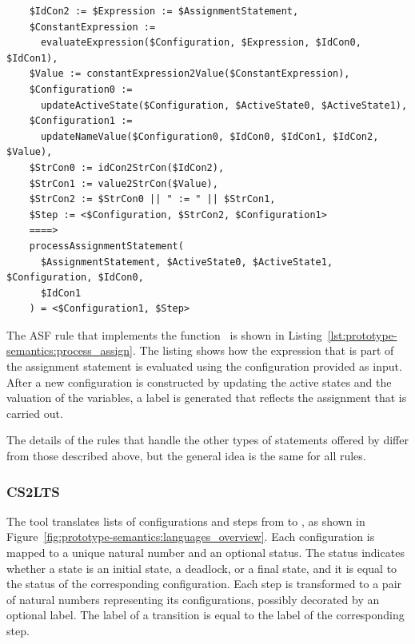 \begin{listing}
  \lstset{
    language=asf,
    style=asf,
    caption=Processing an assignment statement,
    label=lst:prototype-semantics:process_assign,
    numbers=none
  }
  \begin{lstlisting}
    $IdCon2 := $Expression := $AssignmentStatement,
    $ConstantExpression :=
      evaluateExpression($Configuration, $Expression, $IdCon0, $IdCon1),
    $Value := constantExpression2Value($ConstantExpression),
    $Configuration0 :=
      updateActiveState($Configuration, $ActiveState0, $ActiveState1),
    $Configuration1 :=
      updateNameValue($Configuration0, $IdCon0, $IdCon1, $IdCon2, $Value),
    $StrCon0 := idCon2StrCon($IdCon2),
    $StrCon1 := value2StrCon($Value),
    $StrCon2 := $StrCon0 || " := " || $StrCon1,
    $Step := <$Configuration, $StrCon2, $Configuration1>
    ====>
    processAssignmentStatement(
      $AssignmentStatement, $ActiveState0, $ActiveState1, $Configuration, $IdCon0,
      $IdCon1
    ) = <$Configuration1, $Step>
  \end{lstlisting}
\end{listing}

The ASF rule that implements the function~ is shown in Listing~\ref{lst:prototype-semantics:process_assign}.
The listing shows how the expression that is part of the assignment statement is evaluated using the configuration provided as input.
After a new configuration is constructed by updating the active states and the valuation of the variables, a label is generated that reflects the assignment that is carried out.

The details of the rules that handle the other types of statements offered by \SLCO differ from those described above, but the general idea is the same for all rules.



\subsubsection{CS2LTS}
The tool \CStoLTS translates lists of configurations and steps from \CS to \LTS, as shown in Figure~\ref{fig:prototype-semantics:languages_overview}.
Each configuration is mapped to a unique natural number and an optional status.
The status indicates whether a state is an initial state, a deadlock, or a final state, and it is equal to the status of the corresponding configuration.
Each step is transformed to a pair of natural numbers representing its configurations, possibly decorated by an optional label.
The label of a transition is equal to the label of the corresponding step.


